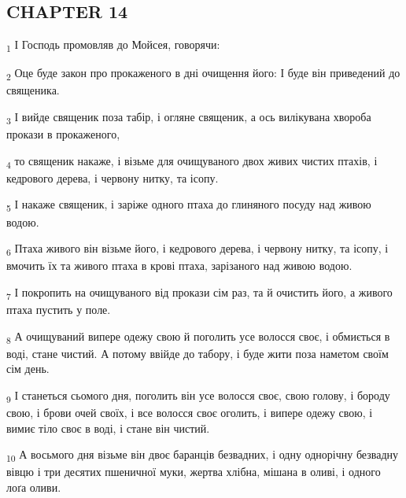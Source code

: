 \subsection{CHAPTER 14}
\begin{tcolorbox}
\textsubscript{1} І Господь промовляв до Мойсея, говорячи:
\end{tcolorbox}
\begin{tcolorbox}
\textsubscript{2} Оце буде закон про прокаженого в дні очищення його: І буде він приведений до священика.
\end{tcolorbox}
\begin{tcolorbox}
\textsubscript{3} І вийде священик поза табір, і огляне священик, а ось вилікувана хвороба прокази в прокаженого,
\end{tcolorbox}
\begin{tcolorbox}
\textsubscript{4} то священик накаже, і візьме для очищуваного двох живих чистих птахів, і кедрового дерева, і червону нитку, та ісопу.
\end{tcolorbox}
\begin{tcolorbox}
\textsubscript{5} І накаже священик, і заріже одного птаха до глиняного посуду над живою водою.
\end{tcolorbox}
\begin{tcolorbox}
\textsubscript{6} Птаха живого він візьме його, і кедрового дерева, і червону нитку, та ісопу, і вмочить їх та живого птаха в крові птаха, зарізаного над живою водою.
\end{tcolorbox}
\begin{tcolorbox}
\textsubscript{7} І покропить на очищуваного від прокази сім раз, та й очистить його, а живого птаха пустить у поле.
\end{tcolorbox}
\begin{tcolorbox}
\textsubscript{8} А очищуваний випере одежу свою й поголить усе волосся своє, і обмиється в воді, стане чистий. А потому ввійде до табору, і буде жити поза наметом своїм сім день.
\end{tcolorbox}
\begin{tcolorbox}
\textsubscript{9} І станеться сьомого дня, поголить він усе волосся своє, свою голову, і бороду свою, і брови очей своїх, і все волосся своє оголить, і випере одежу свою, і вимиє тіло своє в воді, і стане він чистий.
\end{tcolorbox}
\begin{tcolorbox}
\textsubscript{10} А восьмого дня візьме він двоє баранців безвадних, і одну однорічну безвадну вівцю і три десятих пшеничної муки, жертва хлібна, мішана в оливі, і одного лоґа оливи.
\end{tcolorbox}
